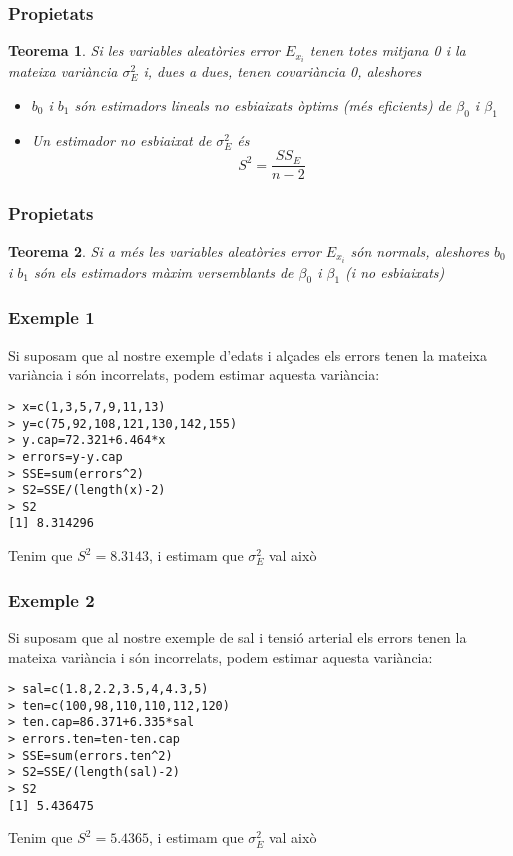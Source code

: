 \documentclass[12pt,t]{beamer}
\renewcommand{\emph}[1]{{\color{red}#1}}
\theoremstyle{plain}
\newtheorem{teorema}{Teorema}
\theoremstyle{definition}
\begin{document}
\begin{frame}
\frametitle{Propietats}

\begin{teorema}
Si les variables aleatòries error $E_{x_i}$ tenen totes mitjana 0 i la mateixa variància $\sigma^2_E$ i, dues a dues, tenen covariància 0, aleshores

\begin{itemize}
\item $b_0$ i $b_1$ són estimadors lineals no esbiaixats òptims (més eficients) de $\beta_0$ i $\beta_1$
\medskip

\item Un estimador no esbiaixat de $\sigma_E^2$ és
$$
S^2=\frac{SS_E}{n-2}
$$
\end{itemize}
\end{teorema}
\end{frame}



\begin{frame}
\frametitle{Propietats}

\begin{teorema}
Si \emph{a més} les variables aleatòries error $E_{x_i}$ són normals, aleshores
 $b_0$ i $b_1$ són els estimadors màxim versemblants de $\beta_0$ i $\beta_1$ (i no esbiaixats)
 \end{teorema}
\end{frame}





\begin{frame}[fragile]
\frametitle{Exemple 1}
Si suposam que al nostre exemple d'edats i alçades els errors tenen la mateixa variància i són incorrelats, podem estimar aquesta variància:
\begin{verbatim}
> x=c(1,3,5,7,9,11,13)
> y=c(75,92,108,121,130,142,155)
> y.cap=72.321+6.464*x
> errors=y-y.cap
> SSE=sum(errors^2)
> S2=SSE/(length(x)-2)
> S2
[1] 8.314296
\end{verbatim}
Tenim que $S^2=8.3143$, i estimam que $\sigma_E^2$ val això
\end{frame}

\begin{frame}[fragile]
\frametitle{Exemple 2}
Si suposam que al nostre exemple de sal i tensió arterial els errors  tenen la mateixa variància i són incorrelats, podem estimar aquesta variància:
\begin{verbatim}
> sal=c(1.8,2.2,3.5,4,4.3,5)
> ten=c(100,98,110,110,112,120)
> ten.cap=86.371+6.335*sal
> errors.ten=ten-ten.cap
> SSE=sum(errors.ten^2)
> S2=SSE/(length(sal)-2)
> S2
[1] 5.436475
\end{verbatim}
Tenim que $S^2=5.4365$, i estimam que $\sigma_E^2$ val això
\end{frame}
\end{document}
